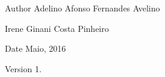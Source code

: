\begin{DoxyAuthor}{Author}
Adelino Afonso Fernandes Avelino 

Irene Ginani Costa Pinheiro 
\end{DoxyAuthor}
\begin{DoxyDate}{Date}
Maio, 2016 
\end{DoxyDate}
\begin{DoxyVersion}{Version}
1. 
\end{DoxyVersion}
